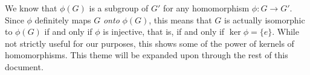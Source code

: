 We \extra know that $\phi(G)$ is a subgroup of $G'$ for any homomorphism $\phi: G \to G'$. Since $\phi$ definitely maps $G$ \textit{onto} $\phi(G)$, this means that $G$ is actually isomorphic to $\phi(G)$ if and only if $\phi$ is injective, that is, if and only if $\ker\phi = \{e\}$. While not strictly useful for our purposes, this shows some of the power of kernels of homomorphisms. This theme will be expanded upon through the rest of this document.